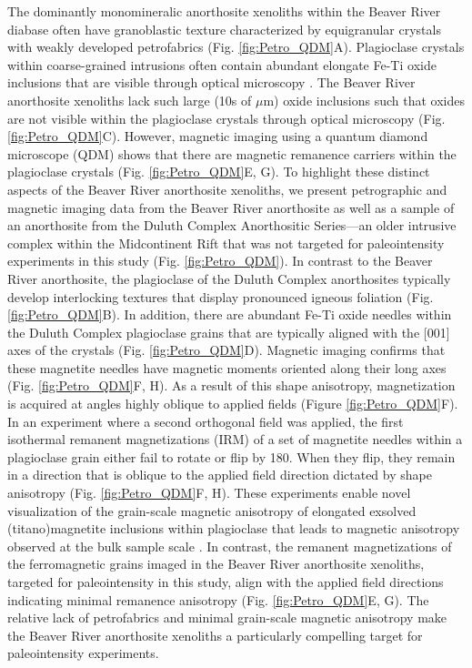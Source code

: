 \documentclass[9pt,twocolumn,twoside,lineno]{pnas-new}
\begin{document}
The dominantly monomineralic anorthosite xenoliths within the Beaver River diabase often have granoblastic texture characterized by equigranular crystals with weakly developed petrofabrics (Fig. \ref{fig:Petro_QDM}A). Plagioclase crystals within coarse-grained intrusions often contain abundant elongate Fe-Ti oxide inclusions that are visible through optical microscopy \cite{Feinberg2006a}. The Beaver River anorthosite xenoliths lack such large (10s of $\mu$m) oxide inclusions such that oxides are not visible within the plagioclase crystals through optical microscopy (Fig. \ref{fig:Petro_QDM}C). However, magnetic imaging using a quantum diamond microscope (QDM) shows that there are magnetic remanence carriers within the plagioclase crystals (Fig. \ref{fig:Petro_QDM}E, G). To highlight these distinct aspects of the Beaver River anorthosite xenoliths, we present petrographic and magnetic imaging data from the Beaver River anorthosite as well as a sample of an anorthosite from the Duluth Complex Anorthositic Series---an older intrusive complex within the Midcontinent Rift that was not targeted for paleointensity experiments in this study (Fig. \ref{fig:Petro_QDM}). In contrast to the Beaver River anorthosite, the plagioclase of the Duluth Complex anorthosites typically develop interlocking textures that display pronounced igneous foliation (Fig. \ref{fig:Petro_QDM}B). In addition, there are abundant Fe-Ti oxide needles within the Duluth Complex plagioclase grains that are typically aligned with the [001] axes of the crystals (Fig. \ref{fig:Petro_QDM}D). Magnetic imaging confirms that these magnetite needles have magnetic moments oriented along their long axes (Fig. \ref{fig:Petro_QDM}F, H). As a result of this shape anisotropy, magnetization is acquired at angles highly oblique to applied fields (Figure \ref{fig:Petro_QDM}F). In an experiment where a second orthogonal field was applied, the first isothermal remanent magnetizations (IRM) of a set of magnetite needles within a plagioclase grain either fail to rotate or flip by 180\textdegree. When they flip, they remain in a direction that is oblique to the applied field direction dictated by shape anisotropy (Fig. \ref{fig:Petro_QDM}F, H). These experiments enable novel visualization of the grain-scale magnetic anisotropy of elongated exsolved (titano)magnetite inclusions within plagioclase that leads to magnetic anisotropy observed at the bulk sample scale \cite{Selkin2000a, Feinberg2006a}. In contrast, the remanent magnetizations of the ferromagnetic grains imaged in the Beaver River anorthosite xenoliths, targeted for paleointensity in this study, align with the applied field directions indicating minimal remanence anisotropy  (Fig. \ref{fig:Petro_QDM}E, G). The relative lack of petrofabrics and minimal grain-scale magnetic anisotropy make the Beaver River anorthosite xenoliths a particularly compelling target for paleointensity experiments.
\end{document}
